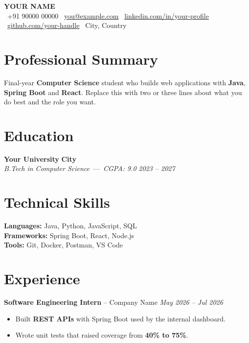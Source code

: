 \documentclass[10pt,a4paper]{article}
\newenvironment{resumebody}{\begin{list}{}{\setlength{\leftmargin}{0.8em}\setlength{\topsep}{0pt}\setlength{\itemsep}{0pt}\setlength{\parsep}{0pt}}\item[]}{\end{list}}
\begin{document}
\begin{center}
{\selectfont\Huge\bfseries\color{accent} \MakeUppercase{Your Name}}\\[5pt]
{\small \faPhone\ +91 90000 00000 \quad \faEnvelope\ \href{mailto:you@example.com}{you@example.com} \quad \faLinkedin\ \href{https://linkedin.com/in/your-profile}{linkedin.com/in/your-profile} \quad \faGithub\ \href{https://github.com/your-handle}{github.com/your-handle} \quad \faMapMarker*\ City, Country}
\end{center}

\section{Professional Summary}
\begin{resumebody}
Final-year \textbf{Computer Science} student who builds web applications with \textbf{Java}, \textbf{Spring Boot} and \textbf{React}. Replace this with two or three lines about what you do best and the role you want.
\end{resumebody}

\section{Education}
\begin{resumebody}
\textbf{Your University} \hfill \textbf{City}\\
\textit{B.Tech in Computer Science} \,---\, \textit{CGPA: 9.0} \hfill \textit{2023 -- 2027}
\end{resumebody}

\section{Technical Skills}
\begin{resumebody}
\textbf{Languages:} Java, Python, JavaScript, SQL\\
\textbf{Frameworks:} Spring Boot, React, Node.js\\
\textbf{Tools:} Git, Docker, Postman, VS Code
\end{resumebody}

\section{Experience}
\begin{resumebody}
  \textbf{Software Engineering Intern} -- Company Name \hfill \textit{May 2026 -- Jul 2026}\\[-9pt]
  \begin{itemize}
    \item Built \textbf{REST APIs} with Spring Boot used by the internal dashboard.
    \item Wrote unit tests that raised coverage from \textbf{40\% to 75\%}.
  \end{itemize}
  \vspace{3pt}
\end{resumebody}
\end{document}
